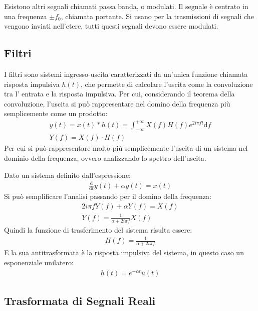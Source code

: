 \documentclass{article}
\newcommand{\df}{\mathrm{d}}
\numberwithin{equation}{subsection}
\begin{document}
Esistono altri segnali chiamati passa banda, o modulati. Il segnale è centrato in una frequenza $\pm f_0$, chiamata portante. Si usano per la trasmissioni di segnali 
che vengono inviati nell'etere, tutti questi segnali devono essere modulati. 

\subsection{Filtri}

I filtri sono sistemi ingresso-uscita caratterizzati da un'unica funzione chiamata risposta impulsiva $h(t)$, che permette di calcolare l'uscita come la convoluzione tra l'
entrata e la risposta impulsiva. Per cui, considerando il teorema della convoluzione, l'uscita si può rappresentare nel domino della frequenza più semplicemente come un prodotto:
\begin{gather*}
    y(t)=x(t)*h(t)=\displaystyle\int_{-\infty}^{+\infty}X(f)H(f)e^{2i\pi ft}\df f\\
    Y(f)=X(f)\cdot H(f)
\end{gather*}
Per cui si può rappresentare molto più semplicemente l'uscita di un sistema nel dominio della frequenza, ovvero analizzando lo spettro dell'uscita. 


Dato un sistema definito dall'espressione:
\begin{gather*}
    \displaystyle\frac{\df}{\df t}y(t)+\alpha y(t)=x(t)
\end{gather*}
Si può semplificare l'analisi passando per il domino della frequenza: 
\begin{gather*}
    2i\pi fY(f)+\alpha Y(f)=X(f)\\
    Y(f)=\displaystyle\frac{1}{\alpha+2i\pi f}X(f)
\end{gather*}
Quindi la funzione di trasferimento del sistema risulta essere:
\begin{gather*}
    H(f)=\displaystyle\frac{1}{\alpha+2i\pi f}
\end{gather*}
E la sua antitrasformata è la risposta impulsiva del sistema, in questo caso un esponenziale unilatero: 
\begin{gather*}
    h(t)=e^{-\alpha t}u(t)
\end{gather*}

\subsection{Trasformata di Segnali Reali}
\end{document}
